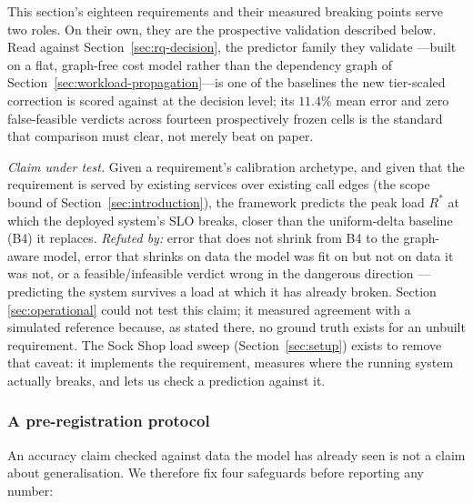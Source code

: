 \documentclass[journal, 10pt]{IEEEtran}
\begin{document}
This section's eighteen requirements and their measured breaking points serve
two roles. On their own, they are the prospective validation described below.
Read against Section~\ref{sec:rq-decision}, the predictor family they validate
---built on a flat, graph-free cost model rather than the dependency graph of
Section~\ref{sec:workload-propagation}---is one of the baselines the new
tier-scaled correction is scored against at the decision level; its $11.4\%$
mean error and zero false-feasible verdicts across fourteen prospectively
frozen cells is the standard that comparison must clear, not merely beat on
paper.

\emph{Claim under test.} Given a requirement's calibration archetype, and given
that the requirement is served by existing services over existing call edges
(the scope bound of Section~\ref{sec:introduction}), the
framework predicts the peak load $R^{*}$ at which the deployed system's SLO
breaks, closer than the uniform-delta baseline (B4) it replaces.
\emph{Refuted by:} error that does not shrink from B4 to the graph-aware
model, error that shrinks on data the model was fit on but not on data it was
not, or a feasible/infeasible verdict wrong in the dangerous direction ---
predicting the system survives a load at which it has already broken. Section
\ref{sec:operational} could not test this claim; it measured agreement with a
simulated reference because, as stated there, no ground truth exists for an
unbuilt requirement. The Sock Shop load sweep (Section~\ref{sec:setup}) exists
to remove that caveat: it implements the requirement, measures where the
running system actually breaks, and lets us check a prediction against it.

\subsubsection{A pre-registration protocol}
\label{sec:rq6-protocol}
An accuracy claim checked against data the model has already seen is not a
claim about generalisation. We therefore fix four safeguards before reporting
any number:
\end{document}
